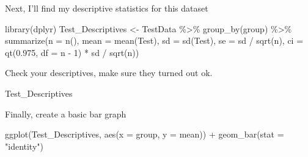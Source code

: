 \documentclass[
]{book}
\newenvironment{Shaded}{\begin{snugshade}}{\end{snugshade}}
\newcommand{\AttributeTok}[1]{\textcolor[rgb]{0.77,0.63,0.00}{#1}}
\newcommand{\DecValTok}[1]{\textcolor[rgb]{0.00,0.00,0.81}{#1}}
\newcommand{\FloatTok}[1]{\textcolor[rgb]{0.00,0.00,0.81}{#1}}
\newcommand{\FunctionTok}[1]{\textcolor[rgb]{0.00,0.00,0.00}{#1}}
\newcommand{\NormalTok}[1]{#1}
\newcommand{\OtherTok}[1]{\textcolor[rgb]{0.56,0.35,0.01}{#1}}
\newcommand{\SpecialCharTok}[1]{\textcolor[rgb]{0.00,0.00,0.00}{#1}}
\newcommand{\StringTok}[1]{\textcolor[rgb]{0.31,0.60,0.02}{#1}}
\begin{document}
\begin{Shaded}
\end{Shaded}

Next, I'll find my descriptive statistics for this dataset

\begin{Shaded}
\begin{Highlighting}[]
\FunctionTok{library}\NormalTok{(dplyr)}
\NormalTok{Test\_Descriptives }\OtherTok{\textless{}{-}}\NormalTok{ TestData }\SpecialCharTok{\%\textgreater{}\%}
  \FunctionTok{group\_by}\NormalTok{(group) }\SpecialCharTok{\%\textgreater{}\%}
  \FunctionTok{summarize}\NormalTok{(}\AttributeTok{n =} \FunctionTok{n}\NormalTok{(),}
            \AttributeTok{mean =} \FunctionTok{mean}\NormalTok{(Test),}
            \AttributeTok{sd =} \FunctionTok{sd}\NormalTok{(Test),}
            \AttributeTok{se =}\NormalTok{ sd }\SpecialCharTok{/} \FunctionTok{sqrt}\NormalTok{(n),}
            \AttributeTok{ci =} \FunctionTok{qt}\NormalTok{(}\FloatTok{0.975}\NormalTok{, }\AttributeTok{df =}\NormalTok{ n }\SpecialCharTok{{-}} \DecValTok{1}\NormalTok{) }\SpecialCharTok{*}\NormalTok{ sd }\SpecialCharTok{/} \FunctionTok{sqrt}\NormalTok{(n))}
\end{Highlighting}
\end{Shaded}

Check your descriptives, make sure they turned out ok.

\begin{Shaded}
\begin{Highlighting}[]
\NormalTok{Test\_Descriptives}
\end{Highlighting}
\end{Shaded}

Finally, create a basic bar graph

\begin{Shaded}
\begin{Highlighting}[]
\FunctionTok{ggplot}\NormalTok{(Test\_Descriptives, }
       \FunctionTok{aes}\NormalTok{(}\AttributeTok{x =}\NormalTok{ group, }
           \AttributeTok{y =}\NormalTok{ mean)) }\SpecialCharTok{+}
  \FunctionTok{geom\_bar}\NormalTok{(}\AttributeTok{stat =} \StringTok{"identity"}\NormalTok{)}
\end{Highlighting}
\end{Shaded}
\end{document}
